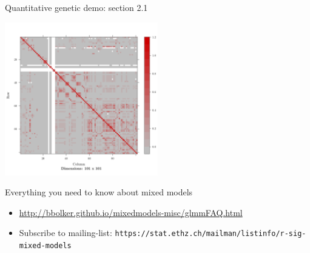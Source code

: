 \documentclass{beamer}
\begin{document}
\begin{frame}{Quantitative genetic demo: section 2.1}
    \begin{center}
        \includegraphics[width=0.5\textwidth]{figure/Gmatrix-1}
    \end{center}    
\end{frame}

\begin{frame}{Everything you need to know about mixed models}

\begin{itemize}
 \item \url{http://bbolker.github.io/mixedmodels-misc/glmmFAQ.html}
 \item Subscribe to mailing-list: \texttt{https://stat.ethz.ch/mailman/listinfo/r-sig-mixed-models}
\end{itemize}

\end{frame}
\end{document}
